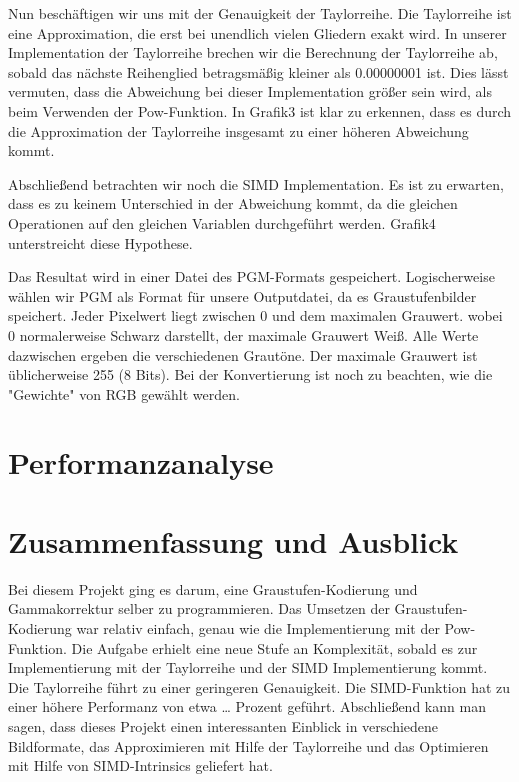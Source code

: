 \documentclass[course=erap]{aspdoc}
\begin{document}
\par
Nun beschäftigen wir uns mit der Genauigkeit der Taylorreihe. Die Taylorreihe ist eine Approximation, die erst bei unendlich vielen Gliedern exakt wird. In unserer Implementation der Taylorreihe brechen wir die Berechnung der Taylorreihe ab, sobald das nächste Reihenglied betragsmäßig kleiner als 0.00000001 ist. Dies lässt vermuten, dass die Abweichung bei dieser Implementation größer sein wird, als beim Verwenden der Pow-Funktion. In Grafik3 ist klar zu erkennen, dass es durch die Approximation der Taylorreihe insgesamt zu einer höheren Abweichung kommt.


\par
Abschließend betrachten wir noch die SIMD Implementation. Es ist zu erwarten, dass es zu keinem Unterschied in der Abweichung kommt, da die gleichen Operationen auf den gleichen Variablen durchgeführt werden. Grafik4 unterstreicht diese Hypothese.

\par
Das Resultat wird in einer Datei des PGM-Formats gespeichert. Logischerweise wählen wir PGM als Format für unsere Outputdatei, da es Graustufenbilder speichert. Jeder Pixelwert liegt zwischen 0 und dem maximalen Grauwert. wobei 0 normalerweise Schwarz darstellt, der maximale Grauwert Weiß. Alle Werte dazwischen ergeben die verschiedenen Grautöne. Der maximale Grauwert ist üblicherweise 255 (8 Bits). Bei der Konvertierung ist noch zu beachten, wie die "Gewichte" von RGB gewählt werden.

\section{Performanzanalyse}


\section{Zusammenfassung und Ausblick}
\par
Bei\cite{vmintromiami} diesem Projekt ging es darum, eine Graustufen-Kodierung und Gammakorrektur selber zu programmieren. Das Umsetzen der Graustufen-Kodierung war relativ einfach, genau wie die Implementierung mit der Pow-Funktion. Die Aufgabe erhielt eine neue Stufe an Komplexität, sobald es zur Implementierung mit der Taylorreihe und der SIMD Implementierung kommt. Die Taylorreihe führt zu einer geringeren Genauigkeit. Die SIMD-Funktion hat zu einer höhere Performanz von etwa … Prozent geführt. Abschließend kann man sagen, dass dieses Projekt einen interessanten Einblick in verschiedene Bildformate, das Approximieren mit Hilfe der Taylorreihe und das Optimieren mit Hilfe von SIMD-Intrinsics geliefert hat.



\end{document}
